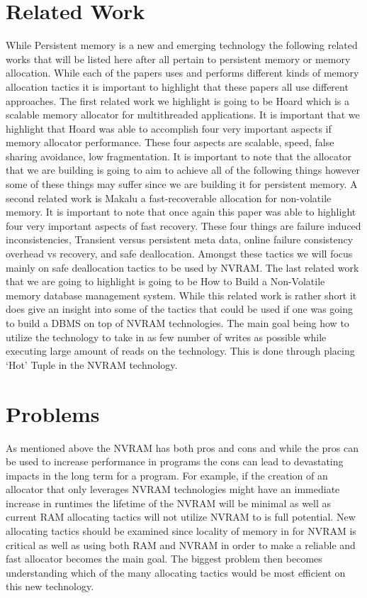\documentclass[conference]{IEEEtran}
\begin{document}
\section{Related Work}
While Persistent memory is a new and emerging technology the following related works that will be listed here after all pertain to persistent memory or memory allocation. While each of the papers uses and performs different kinds of memory allocation tactics it is important to highlight that these papers all use different approaches. The first related work we highlight is going to be Hoard which is a scalable memory allocator for multithreaded applications. It is important that we highlight that Hoard was able to accomplish four very important aspects if memory allocator performance. These four aspects are scalable, speed, false sharing avoidance, low fragmentation. It is important to note that the allocator that we are building is going to aim to achieve all of the following things however some of these things may suffer since we are building it for persistent memory. A second related work is Makalu a fast-recoverable allocation for non-volatile memory. It is important to note that once again this paper was able to highlight four very important aspects of fast recovery. These four things are failure induced inconsistencies, Transient versus persistent meta data, online failure consistency overhead vs recovery, and safe deallocation. Amongst these tactics we will focus mainly on safe deallocation tactics to be used by NVRAM. The last related work that we are going to highlight is going to be How to Build a Non-Volatile memory database management system. While this related work is rather short it does give an insight into some of the tactics that could be used if one was going to build a DBMS on top of NVRAM technologies. The main goal being how to utilize the technology to take in as few number of writes as possible while executing large amount of reads on the technology. This is done through placing ‘Hot’ Tuple in the NVRAM technology. 

\section{Problems}
As mentioned above the NVRAM has both pros and cons and while the pros can be used to increase performance in programs the cons can lead to devastating impacts in the long term for a program. For example, if the creation of an allocator that only leverages NVRAM technologies might have an immediate increase in runtimes the lifetime of the NVRAM will be minimal as well as current RAM allocating tactics will not utilize NVRAM to is full potential. New allocating tactics should be examined since locality of memory in for NVRAM is critical as well as using both RAM and NVRAM in order to make a reliable and fast allocator becomes the main goal. The biggest problem then becomes understanding which of the many allocating tactics would be most efficient on this new technology. 
\end{document}
